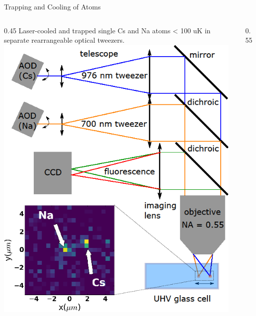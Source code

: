 \documentclass[final]{beamer}
\newlength{\coltwowid}
\begin{document}
\begin{frame}[t]
\begin{columns}[t]
    \begin{column}{\coltwowid}
      \begin{block}{Trapping and Cooling of Atoms}
        \begin{columns}[T]
          \begin{column}{0.45\coltwowid}
            \vspace{1ex}
            Laser-cooled and trapped single Cs and Na atoms < 100 uK in
            separate rearrangeable optical tweezers.\\
            \vspace{1ex}
            \includegraphics[width=0.45\coltwowid]{tweezer.png}
          \end{column}
          \begin{column}{0.55\coltwowid}
            \begin{tikzpicture}

\end{tikzpicture}
\end{column}
\end{columns}
\end{block}
\end{column}
\end{columns}
\end{frame}
\end{document}
